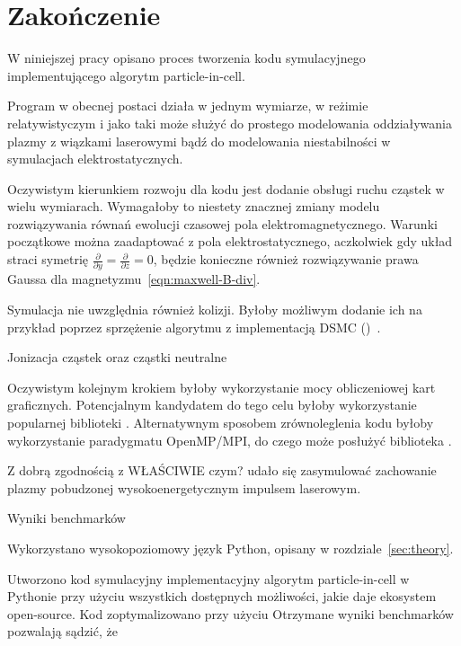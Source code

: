 \section[Zakończenie]{Zakończenie}\label{sec:ending} %

W niniejszej pracy opisano proces tworzenia kodu symulacyjnego implementującego
algorytm particle-in-cell.

Program w obecnej postaci działa w jednym wymiarze, w reżimie relatywistyczym i jako taki może służyć do prostego modelowania oddziaływania plazmy z wiązkami laserowymi
bądź do modelowania niestabilności w symulacjach elektrostatycznych.

Oczywistym kierunkiem rozwoju dla kodu jest dodanie obsługi ruchu cząstek w wielu wymiarach. Wymagałoby to niestety znacznej zmiany modelu rozwiązywania równań ewolucji czasowej pola elektromagnetycznego.
Warunki początkowe można zaadaptować z pola elektrostatycznego, aczkolwiek gdy układ straci symetrię $\frac{\partial}{\partial y} = \frac{\partial}{\partial z} = 0$, będzie konieczne również rozwiązywanie
prawa Gaussa dla magnetyzmu~\ref{eqn:maxwell-B-div}.

Symulacja nie uwzględnia również kolizji. Byłoby możliwym dodanie ich na przykład poprzez sprzężenie algorytmu z implementacją DSMC ()~\cite{particleincell-dmsc}. %

Jonizacja cząstek oraz cząstki neutralne %

Oczywistym kolejnym krokiem byłoby wykorzystanie mocy obliczeniowej kart graficznych. Potencjalnym kandydatem do tego celu byłoby wykorzystanie popularnej biblioteki .
Alternatywnym sposobem zrównoleglenia kodu byłoby wykorzystanie paradygmatu OpenMP/MPI, do czego może posłużyć biblioteka .

Z dobrą zgodnością z WŁAŚCIWIE czym? udało się zasymulować zachowanie plazmy pobudzonej wysokoenergetycznym impulsem laserowym. %

Wyniki benchmarków %



Wykorzystano wysokopoziomowy język Python, opisany w rozdziale~\ref{sec:theory}.



Utworzono kod symulacyjny implementacyjny algorytm particle-in-cell w Pythonie przy użyciu wszystkich dostępnych
możliwości, jakie daje ekosystem open-source. Kod zoptymalizowano przy użyciu 
Otrzymane wyniki benchmarków pozwalają sądzić, że \todo[inline]



